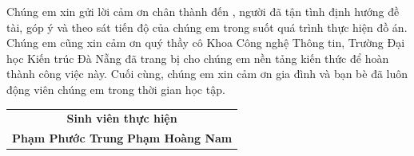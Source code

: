\begin{acknowledgments}

Chúng em xin gửi lời cảm ơn chân thành đến \dauGVHD, người đã tận tình định hướng
đề tài, góp ý và theo sát tiến độ của chúng em trong suốt quá trình thực hiện đồ
án. Chúng em cũng xin cảm ơn quý thầy cô Khoa Công nghệ Thông tin, Trường Đại học
Kiến trúc Đà Nẵng đã trang bị cho chúng em nền tảng kiến thức để hoàn thành công
việc này. Cuối cùng, chúng em xin cảm ơn gia đình và bạn bè đã luôn động viên chúng em
trong thời gian học tập.
\vspace{1.4em}
\hfill
\begin{tabular}{c}
\textbf{Sinh viên thực hiện} \\[3.5em]
\textbf{Phạm Phước Trung} \quad \textbf{Phạm Hoàng Nam}
\end{tabular}

\end{acknowledgments}